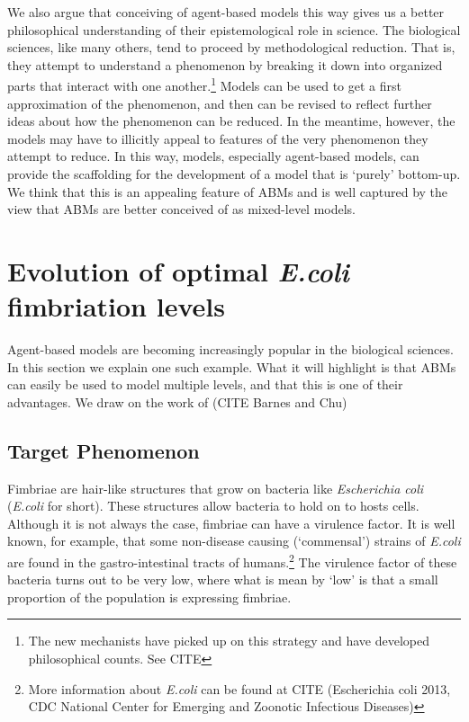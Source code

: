 \documentclass[11pt]{article}
\begin{document}
We also argue that conceiving of agent-based models this way gives us a better philosophical understanding of their epistemological role in science.  The biological sciences, like many others, tend to proceed by methodological reduction. That is, they attempt to understand a phenomenon by breaking it down into organized parts that interact with one another.\footnote{The new mechanists have picked up on this strategy and have developed philosophical counts. See CITE}  Models can be used to get a first approximation of the phenomenon, and then can be revised to reflect further ideas about how the phenomenon can be reduced. In the meantime, however, the models may have to illicitly appeal to features of the very phenomenon they attempt to reduce. In this way, models, especially agent-based models, can provide the scaffolding for the development of a model that is `purely' bottom-up.  We think that this is an appealing feature of ABMs and is well captured by the view that ABMs are better conceived of as mixed-level models.

\section{Evolution of optimal \emph{E.coli} fimbriation levels}

Agent-based models are becoming increasingly popular in the biological sciences. In this section we explain one such example. What it will highlight is that ABMs can easily be used to model multiple levels, and that this is one of their advantages. We draw on the work of (CITE Barnes and Chu)


\subsection{Target Phenomenon}

Fimbriae are hair-like structures that grow on bacteria like \emph{Escherichia coli} (\emph{E.coli} for short).  These structures allow bacteria to hold on to hosts cells.  Although it is not always the case, fimbriae can have a virulence factor. It is well known, for example, that some non-disease causing (`commensal') strains of \emph{E.coli} are found in the gastro-intestinal tracts of humans.\footnote{More information about \emph{E.coli} can be found at CITE (Escherichia coli 2013, CDC National Center for Emerging and Zoonotic Infectious Diseases)}  The virulence factor of these bacteria turns out to be very low, where what is mean by `low' is that a small proportion of the population is expressing fimbriae.
\end{document}
